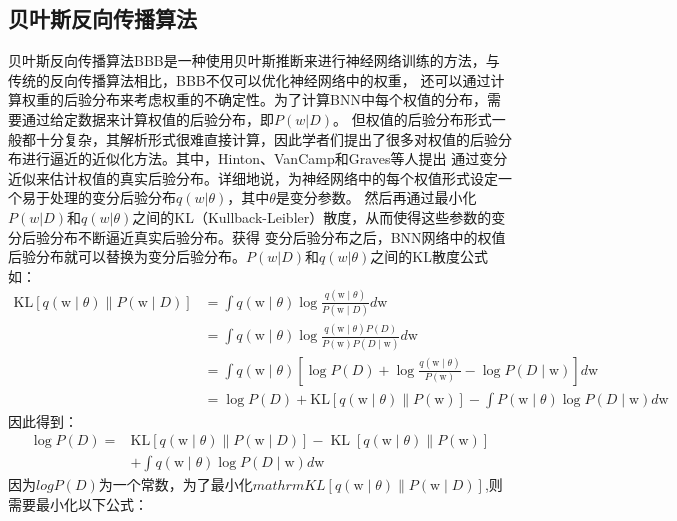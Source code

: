 \subsection{贝叶斯反向传播算法}
贝叶斯反向传播算法BBB是一种使用贝叶斯推断来进行神经网络训练的方法，与传统的反向传播算法相比，BBB不仅可以优化神经网络中的权重，
还可以通过计算权重的后验分布来考虑权重的不确定性。为了计算BNN中每个权值的分布，需要通过给定数据来计算权值的后验分布，即$P(w|D)$。
但权值的后验分布形式一般都十分复杂，其解析形式很难直接计算，因此学者们提出了很多对权值的后验分布进行逼近的近似化方法。其中，Hinton、VanCamp\cite{hinton1993keeping}和Graves等人\cite{graves2011practical}提出
通过变分近似来估计权值的真实后验分布。详细地说，为神经网络中的每个权值形式设定一个易于处理的变分后验分布$q(w|\theta)$，其中$\theta$是变分参数。
然后再通过最小化$P(w|D)$和$q(w|\theta)$之间的KL（Kullback-Leibler）散度，从而使得这些参数的变分后验分布不断逼近真实后验分布。获得
变分后验分布之后，BNN网络中的权值后验分布就可以替换为变分后验分布。$P(w|D)$和$q(w|\theta)$之间的KL散度公式如：
\begin{equation}
	\label{}
	\begin{aligned}
	\mathrm{KL}[q(\mathrm{w} \mid \theta) \| P(\mathrm{w} \mid D)] & =\int q(\mathrm{w} \mid \theta) \log \frac{q(\mathrm{w} \mid \theta)}{P(\mathrm{w} \mid D)} d \mathrm{w} \\
	& =\int q(\mathrm{w} \mid \theta) \log \frac{q(\mathrm{w} \mid \theta) P(D)}{P(\mathrm{w}) P(D \mid \mathrm{w})} d \mathrm{w} \\
	& =\int q(\mathrm{w} \mid \theta)\left[\log P(D)+\log \frac{q(\mathrm{w} \mid \theta)}{P(\mathrm{w})}-\log P(D \mid \mathrm{w})\right] d \mathrm{w} \\
	& =\log P(D)+\mathrm{KL}[q(\mathrm{w} \mid \theta) \| P(\mathrm{w})]-\int P(\mathrm{w} \mid \theta) \log P(D \mid \mathrm{w}) d \mathrm{w}
	\end{aligned}
\end{equation}
因此得到：
\begin{equation}
	\label{}
	\begin{aligned}
	\log P(D)= & \mathrm{KL}[q(\mathrm{w} \mid \theta) \| P(\mathrm{w} \mid D)]-\operatorname{KL}[q(\mathrm{w} \mid \theta) \| P(\mathrm{w})] \\
	& +\int q(\mathrm{w} \mid \theta) \log P(D \mid \mathrm{w}) d \mathrm{w}
	\end{aligned}
\end{equation}
因为$log P(D)$为一个常数，为了最小化$mathrm{KL}[q(\mathrm{w} \mid \theta) \| P(\mathrm{w} \mid D)]$,则需要最小化以下公式：
